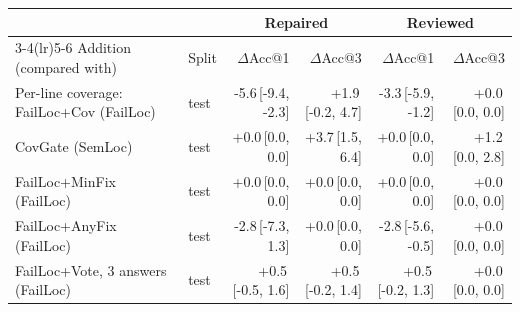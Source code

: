 \begin{tabular}{llrrrr}
\toprule
 & & \multicolumn{2}{c}{Repaired} & \multicolumn{2}{c}{Reviewed} \\
\cmidrule(lr){3-4}\cmidrule(lr){5-6}
Addition (compared with) & Split & $\Delta$Acc@1 & $\Delta$Acc@3 & $\Delta$Acc@1 & $\Delta$Acc@3 \\
\midrule
Per-line coverage: FailLoc+Cov (FailLoc) & test & -5.6{\scriptsize\,[-9.4, -2.3]} & +1.9{\scriptsize\,[-0.2, 4.7]} & -3.3{\scriptsize\,[-5.9, -1.2]} & +0.0{\scriptsize\,[0.0, 0.0]} \\
CovGate (SemLoc) & test & +0.0{\scriptsize\,[0.0, 0.0]} & +3.7{\scriptsize\,[1.5, 6.4]} & +0.0{\scriptsize\,[0.0, 0.0]} & +1.2{\scriptsize\,[0.0, 2.8]} \\
FailLoc+MinFix (FailLoc) & test & +0.0{\scriptsize\,[0.0, 0.0]} & +0.0{\scriptsize\,[0.0, 0.0]} & +0.0{\scriptsize\,[0.0, 0.0]} & +0.0{\scriptsize\,[0.0, 0.0]} \\
FailLoc+AnyFix (FailLoc) & test & -2.8{\scriptsize\,[-7.3, 1.3]} & +0.0{\scriptsize\,[0.0, 0.0]} & -2.8{\scriptsize\,[-5.6, -0.5]} & +0.0{\scriptsize\,[0.0, 0.0]} \\
FailLoc+Vote, 3 answers (FailLoc) & test & +0.5{\scriptsize\,[-0.5, 1.6]} & +0.5{\scriptsize\,[-0.2, 1.4]} & +0.5{\scriptsize\,[-0.2, 1.3]} & +0.0{\scriptsize\,[0.0, 0.0]} \\
\bottomrule
\end{tabular}
